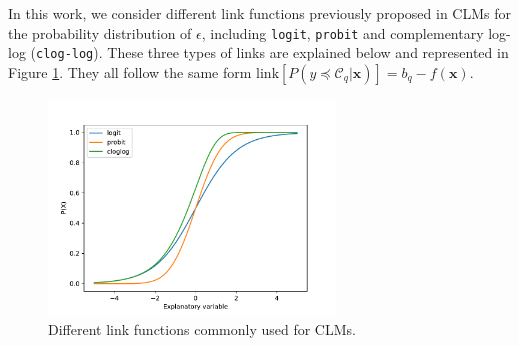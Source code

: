 \documentclass[preprint]{elsarticle}
\begin{document}
In this work, we consider different link functions previously proposed in CLMs for the probability distribution of $\epsilon$, including \texttt{logit}, \texttt{probit} and complementary log-log (\texttt{clog-log}). These three types of links are explained below and represented in Figure \ref{fig:linkfunctions}. They all follow the same form $\text{link}[P(y \preceq \mathcal{C}_q | \mathbf{x})] = b_q - f(\mathbf{x})$.

\begin{figure}[!t]
	\centering
	\includegraphics[width=3in]{img/linkfunctions.pdf}
	\caption{Different link functions commonly used for CLMs.}
	\label{fig:linkfunctions}
\end{figure}
\end{document}
